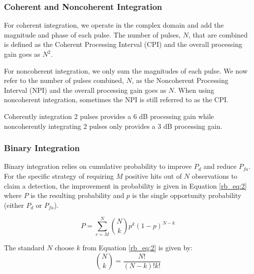 \subsubsection{Coherent and Noncoherent Integration}
For coherent integration, we operate in the complex domain and add the magnitude and phase of each pulse. The number of pulses, $N$, that are combined is defined as the Coherent Processing Interval (CPI) and the overall processing gain goes as $N^2$.

For noncoherent integration, we only sum the magnitudes of each pulse. We now refer to the number of pulses combined, $N$, as the Noncoherent Processing Interval (NPI) and the overall processing gain goes as $N$. When using noncoherent integration, sometimes the NPI is still referred to as the CPI.

Coherently integration $2$ pulses provides a $6$ dB processing gain while noncoherently integrating $2$ pulses only provides a $3$ dB processing gain.

\subsubsection{Binary Integration}
Binary integration relies on cumulative probability to improve $P_d$ and reduce $P_{fa}$. For the specific strategy of requiring $M$ positive hits out of $N$ observations to claim a detection, the improvement in probability is given in Equation \ref{rb_eq:2} where $P$ is the resulting probability and $p$ is the single opportunity probability (either $P_d$ or $P_{fa}$). 

\begin{equation}
\label{rb_eq:2}
P = \sum_{r=M}^N\binom{N}{k}p^k\left(1-p \right)^{N-k}
\end{equation}

The standard $N$ choose $k$ from Equation \ref{rb_eq:2} is given by:
\begin{equation}
\label{rb_eq:3}
\binom{N}{k} = \frac{N!}{(N-k)!k!}
\end{equation}
